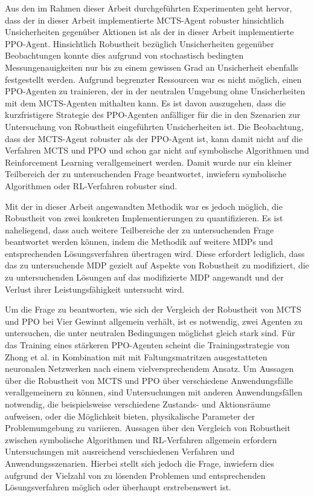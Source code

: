 Aus den im Rahmen dieser Arbeit durchgeführten Experimenten geht hervor, dass der in dieser Arbeit implementierte MCTS-Agent robuster hinsichtlich Unsicherheiten gegenüber Aktionen ist als der in dieser Arbeit implementierte PPO-Agent. Hinsichtlich Robustheit bezüglich Unsicherheiten gegenüber Beobachtungen konnte dies aufgrund von stochastisch bedingten Messungenauigkeiten nur bis zu einem gewissen Grad an Unsicherheit ebenfalls festgestellt werden. Aufgrund begrenzter Ressourcen war es nicht möglich, einen PPO-Agenten zu trainieren, der in der neutralen Umgebung ohne Unsicherheiten mit dem MCTS-Agenten mithalten kann. Es ist davon auszugehen, dass die kurzfristigere Strategie des PPO-Agenten anfälliger für die in den Szenarien zur Untersuchung von Robustheit eingeführten Unsicherheiten ist. Die Beobachtung, dass der MCTS-Agent robuster als der PPO-Agent ist, kann damit nicht auf die Verfahren MCTS und PPO und schon gar nicht auf symbolische Algorithmen und Reinforcement Learning verallgemeinert werden. Damit wurde nur ein kleiner Teilbereich der zu untersuchenden Frage beantwortet, inwiefern symbolische Algorithmen oder RL-Verfahren robuster sind.

Mit der in dieser Arbeit angewandten Methodik war es jedoch möglich, die Robustheit von zwei konkreten Implementierungen zu quantifizieren. Es ist naheliegend, dass auch weitere Teilbereiche der zu untersuchenden Frage beantwortet werden können, indem die Methodik auf weitere MDPs und entsprechenden Lösungsverfahren übertragen wird. Diese erfordert lediglich, dass das zu untersuchende MDP gezielt auf Aspekte von Robustheit zu modifiziert, die zu untersuchenden Lösungen auf das modifizierte MDP angewandt und der Verlust ihrer Leistungsfähigkeit untersucht wird.

Um die Frage zu beantworten, wie sich der Vergleich der Robustheit von MCTS und PPO bei Vier Gewinnt allgemein verhält, ist es notwendig, zwei Agenten zu untersuchen, die unter neutralen Bedingungen möglichst gleich stark sind. Für das Training eines stärkeren PPO-Agenten scheint die Trainingsstrategie von Zhong et al. in Kombination mit mit Faltungsmatritzen ausgestatteten neuronalen Netzwerken nach einem vielversprechendem Ansatz. Um Aussagen über die Robustheit von MCTS und PPO über verschiedene Anwendungsfälle verallgemeinern zu können, sind Untersuchungen mit anderen Anwendungsfällen notwendig, die beispielsweise verschiedene Zustands- und Aktionsräume aufweisen, oder die Möglichkeit bieten, physikalische Parameter der Problemumgebung zu variieren. Aussagen über den Vergleich von Robustheit zwischen symbolische Algorithmen und RL-Verfahren allgemein erfordern Untersuchungen mit ausreichend verschiedenen Verfahren und Anwendungsszenarien. Hierbei stellt sich jedoch die Frage, inwiefern dies aufgrund der Vielzahl von zu lösenden Problemen und entsprechenden Lösungsverfahren möglich oder überhaupt erstrebenswert ist.
